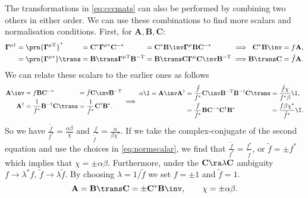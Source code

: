 \documentclass[11pt]{article}
\newcommand{\invd}{^{-\dag}}
\newcommand{\invt}{^{-\mathrm{T}}}
\newcommand{\invc}{^{-\ast}}
\newcommand{\Gammab}{\boldsymbol{\Gamma}}
\newcommand{\Gammap}[1][\mu]{\prn{\Gammab^{#1}}}
\newcommand{\mud}{{\mu\dag}}
\newcommand{\mut}{{\mu\mathrm{T}}}
\newcommand{\muc}{{\mu\ast}}
\newcommand{\A}{\mathbf{A}}
\newcommand{\B}{\mathbf{B}}
\renewcommand{\C}{\mathbf{C}}
\begin{document}
The transformations in \cref{eq:cccmats} can also be performed by combining two others in either order.
We can use these combinations to find more scalars and normalisation conditions.
First, for $\A,\B,\C$:
%
\begin{equation*}
\begin{alignedat}{5}
  \Gammab^\mud &= \Gammap[\mut]^\ast &
    &= \C^\ast \Gammab^\muc \C\invc &
    &= \C^\ast \B\inv \Gammab^\mu \B \C\invc &
    &\implies &
  \C^\ast \B\inv &= f \A, \\
   &= \Gammap[\muc]\trans &
    &= \B\trans \Gammab^\mut \B\invt &
    &= \B\trans \C \Gammab^\mu \C\inv \B\invt &
    &\implies &
  \B\trans \C &= \tilde{f} \A. \\
\end{alignedat}
\end{equation*}
%
We can relate these scalars to the earlier ones as follows
%
\begin{equation*}
\begin{alignedat}{2}
  \A\inv &= f \B \C\invc &
    &= \tilde{f} \C\inv \B\invt \\
  \A^\dag &= \frac{1}{f^\ast} \B\invd \C\trans &
    &= \frac{1}{\tilde{f}^\ast} \C^\dag \B^\ast.
\end{alignedat}
   \implies
\begin{alignedat}{3}
  \alpha \I &= \A\inv \A^\dag &
    &= \frac{\tilde{f}}{f^\ast} \C\inv \B\invt \B\invd \C\trans &
      &= \frac{\tilde{f} \chi}{f^\ast \beta} \I, \\ &&
    &= \frac{f}{\tilde{f}^\ast} \B \C\invc \C^\dag \B^\ast &
      &= \frac{f \beta \chi^\ast}{\tilde{f}^\ast} \I.
\end{alignedat}
\end{equation*}
%
So we have \( \frac{\tilde{f}}{f^\ast} = \frac{\alpha \beta}{\chi} \)
and \( \frac{f}{\tilde{f}^\ast} = \frac{\alpha}{\beta \chi^\ast} \).
If we take the complex-conjugate of the second equation and use the choices in \cref{eq:normscalar},
we find that \( \frac{\tilde{f}}{f^\ast} = \frac{f^\ast}{\tilde{f}} \),
or \( \tilde{f} = \pm f^\ast \) which implies that $\chi = \pm \alpha \beta$.
Furthermore, under the $\C \ra \lambda \C$ ambiguity \( f \rightarrow \lambda^\ast f\),
\(\tilde{f} \rightarrow \lambda \tilde{f} \).
By choosing $\lambda = 1/\tilde{f}$ we set $f = \pm1$ and $\tilde{f} = 1$.
%
\begin{equation}\label{eq:comboABC}
  \A = \B\trans \C = \pm \C^\ast \B\inv, \qquad
  \chi = \pm \alpha \beta.
\end{equation}
\end{document}
